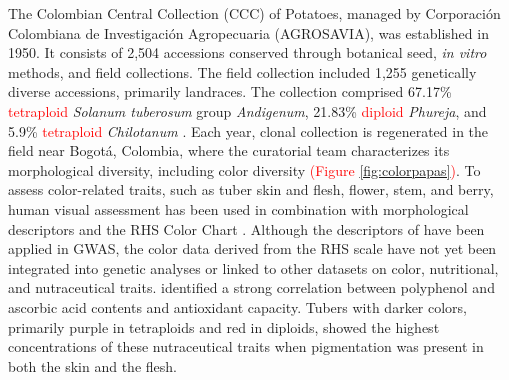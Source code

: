 \documentclass[pdflatex,sn-mathphys-ay]{sn-jnl}%
\begin{document}
The Colombian Central Collection (CCC) of Potatoes, managed by Corporación Colombiana de Investigación Agropecuaria (AGROSAVIA), was established in 1950. It consists of 2,504 accessions conserved through botanical seed, \textit{in vitro} methods, and field collections. The field collection included 1,255 genetically diverse accessions, primarily landraces. The collection comprised 67.17\% \textcolor{red}{tetraploid} \textit{Solanum tuberosum} group \textit{Andigenum}, 21.83\% \textcolor{red}{diploid} \textit{Phureja}, and 5.9\% \textcolor{red}{tetraploid} \textit{Chilotanum} \citep{manrique2023defining, Berdugo2017}. Each year, clonal collection is regenerated in the field near Bogotá, Colombia, where the curatorial team characterizes its morphological diversity, including color diversity \textcolor{red}{(Figure \ref{fig:colorpapas})}. To assess color-related traits, such as tuber skin and flesh, flower, stem, and berry, human visual assessment has been used in combination with morphological descriptors \citep{gomez2000guia} and the RHS Color Chart \citep{RHS2015}.  Although the descriptors of \cite{gomez2000guia} have been applied in GWAS\citep{Berdugo2017, berdugo2023phenotypic}, the color data derived from the RHS scale have not yet been integrated into genetic analyses or linked to other datasets on color, nutritional, and nutraceutical traits. \cite{berdugo2023phenotypic} identified a strong correlation between polyphenol and ascorbic acid contents and antioxidant capacity. Tubers with darker colors, primarily purple in tetraploids and red in diploids, showed the highest concentrations of these nutraceutical traits when pigmentation was present in both the skin and the flesh.

\end{document}
